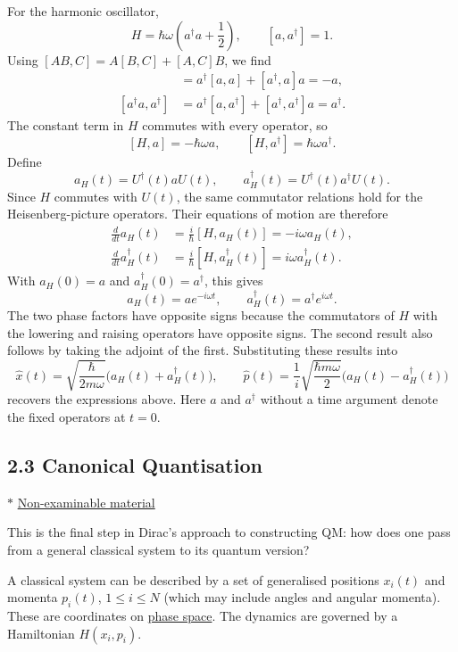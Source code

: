 \documentclass[11pt,a4paper]{article}
\begin{document}
For the harmonic oscillator,
\[
    H=\hbar\omega\left(a^\dagger a+\frac{1}{2}\right),
    \qquad [a,a^\dagger]=1.
\]
Using $[AB,C]=A[B,C]+[A,C]B$, we find
\begin{align*}
    [a^\dagger a,a]&=a^\dagger[a,a]+[a^\dagger,a]a=-a,\\
    [a^\dagger a,a^\dagger]
        &=a^\dagger[a,a^\dagger]+[a^\dagger,a^\dagger]a=a^\dagger.
\end{align*}
The constant term in $H$ commutes with every operator, so
\[
    [H,a]=-\hbar\omega a,
    \qquad [H,a^\dagger]=\hbar\omega a^\dagger.
\]
Define
\[
    a_H(t)=U^\dagger(t)aU(t),
    \qquad a_H^\dagger(t)=U^\dagger(t)a^\dagger U(t).
\]
Since $H$ commutes with $U(t)$, the same commutator relations hold for
the Heisenberg-picture operators. Their equations of motion are therefore
\begin{align*}
    \frac{d}{dt}a_H(t)&=\frac{i}{\hbar}[H,a_H(t)]
        =-i\omega a_H(t),\\
    \frac{d}{dt}a_H^\dagger(t)&=\frac{i}{\hbar}[H,a_H^\dagger(t)]
        =i\omega a_H^\dagger(t).
\end{align*}
With $a_H(0)=a$ and $a_H^\dagger(0)=a^\dagger$, this gives
\[
    \boxed{a_H(t)=ae^{-i\omega t},\qquad
           a_H^\dagger(t)=a^\dagger e^{i\omega t}.}
\]
The two phase factors have opposite signs because the commutators of $H$
with the lowering and raising operators have opposite signs. The second
result also follows by taking the adjoint of the first.
Substituting these results into
\[
    \hat{x}(t)=\sqrt{\frac{\hbar}{2m\omega}}
        \bigl(a_H(t)+a_H^\dagger(t)\bigr),
    \qquad
    \hat{p}(t)=\frac{1}{i}\sqrt{\frac{\hbar m\omega}{2}}
        \bigl(a_H(t)-a_H^\dagger(t)\bigr)
\]
recovers the expressions above. Here $a$ and $a^\dagger$ without a time
argument denote the fixed operators at $t=0$.

\subsection*{2.3 Canonical Quantisation}

\noindent
$\ast$ \underline{Non-examinable material}

This is the final step in Dirac's approach to constructing QM:
how does one pass from a general classical system to its quantum version?

A classical system can be described by a set of generalised positions
$x_i(t)$ and momenta $p_i(t)$, $1\leq i\leq N$ (which may include angles
and angular momenta). These are coordinates on \underline{phase space}.
The dynamics are governed by a Hamiltonian $H(x_i,p_i)$.
\end{document}
